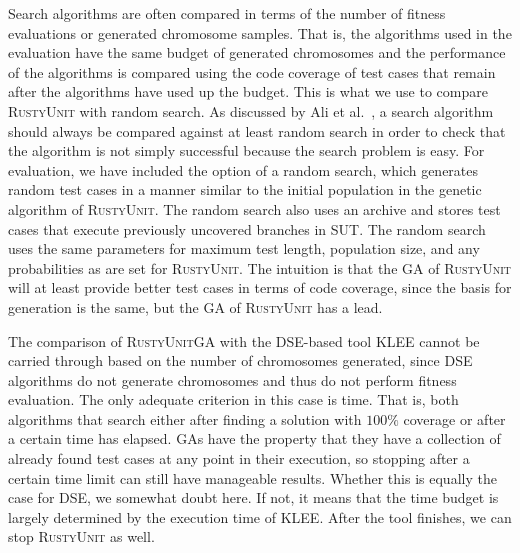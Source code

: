 \documentclass[paper=a4,%
  twoside,%
  BCOR4mm,%
  abstract=true,%
  toc=bibliography,%
  chapterprefix=true,%
  toc=bibliographynumbered,%
  open=right,%
  english,%
  pagesize=pdftex]{scrreprt}
\newcommand{\tech}{\textsc{RustyUnit}\xspace}
\begin{document}
Search algorithms are often compared in terms of the number of fitness evaluations or generated chromosome samples. That is, the algorithms used in the evaluation have the same budget of generated chromosomes and the performance of the algorithms is compared using the code coverage of test cases that remain after the algorithms have used up the budget. This is what we use to compare \tech with random search. As discussed by Ali et al.~\cite{Ali2010}, a search algorithm should always be compared against at least random search in order to check that the algorithm is not simply successful because the search problem is easy. For evaluation, we have included the option of a random search, which generates random test cases in a manner similar to the initial population in the genetic algorithm of \tech. The random search also uses an archive and stores test cases that execute previously uncovered branches in \ac{SUT}. The random search uses the same parameters for maximum test length, population size, and any probabilities as are set for \tech. The intuition is that the \ac{GA} of \tech will at least provide better test cases in terms of code coverage, since the basis for generation is the same, but the \ac{GA} of \tech has a lead.

The comparison of \tech \ac{GA} with the \ac{DSE}-based tool \textsc{KLEE} cannot be carried through based on the number of chromosomes generated, since \ac{DSE} algorithms do not generate chromosomes and thus do not perform fitness evaluation. The only adequate criterion in this case is time. That is, both algorithms that search either after finding a solution with $100\%$ coverage or after a certain time has elapsed. \acp{GA} have the property that they have a collection of already found test cases at any point in their execution, so stopping after a certain time limit can still have manageable results. Whether this is equally the case for \ac{DSE}, we somewhat doubt here. If not, it means that the time budget is largely determined by the execution time of \textsc{KLEE}. After the tool finishes, we can stop \tech as well.

\end{document}
